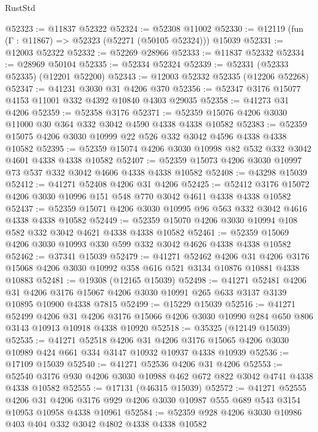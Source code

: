 \begin{lexlean}{RustStd}
\begin{coremodule}
@52323 := @11837 @52322
@52324 := @52308 @11002
@52330 := @12119 (fun (Γ : @11867) => @52323 (@52271 (@50105 @52324))) @15039
@52331 := @12003 @52322
@52332 := @52269 @28966
@52333 := @11837 @52332
@52334 := @28969 @50104
@52335 := @52334 @52324
@52339 := @52331 (@52333 @52335) (@12201 @52200)
@52343 := @12003 @52332 @52335 (@12206 @52268)
@52347 := @41231 @3030 @31 @4206 @370
@52356 := @52347 @3176 @15077 @4153 @11001 @332 @4392 @10840 @4303 @29035
@52358 := @41273 @31 @4206
@52359 := @52358 @3176
@52371 := @52359 @15076 @4206 @3030 @11000 @30 @364 @332 @3042 @4590 @4338 @4338 @10582
@52383 := @52359 @15075 @4206 @3030 @10999 @22 @526 @332 @3042 @4596 @4338 @4338 @10582
@52395 := @52359 @15074 @4206 @3030 @10998 @82 @532 @332 @3042 @4601 @4338 @4338 @10582
@52407 := @52359 @15073 @4206 @3030 @10997 @73 @537 @332 @3042 @4606 @4338 @4338 @10582
@52408 := @43298 @15039
@52412 := @41271 @52408 @4206 @31 @4206
@52425 := @52412 @3176 @15072 @4206 @3030 @10996 @151 @548 @770 @3042 @4611 @4338 @4338 @10582
@52437 := @52359 @15071 @4206 @3030 @10995 @96 @563 @332 @3042 @4616 @4338 @4338 @10582
@52449 := @52359 @15070 @4206 @3030 @10994 @108 @582 @332 @3042 @4621 @4338 @4338 @10582
@52461 := @52359 @15069 @4206 @3030 @10993 @330 @599 @332 @3042 @4626 @4338 @4338 @10582
@52462 := @37341 @15039
@52479 := @41271
    @52462
    @4206
    @31
    @4206
    @3176
    @15068
    @4206
    @3030
    @10992
    @358
    @616
    @521
    @3134
    @10876
    @10881
    @4338
    @10883
@52481 := @19308 (@12165 @15039)
@52498 := @41271
    @52481
    @4206
    @31
    @4206
    @3176
    @15067
    @4206
    @3030
    @10991
    @265
    @633
    @3137
    @3139
    @10895
    @10900
    @4338
    @7815
@52499 := @15229 @15039
@52516 := @41271
    @52499
    @4206
    @31
    @4206
    @3176
    @15066
    @4206
    @3030
    @10990
    @284
    @650
    @806
    @3143
    @10913
    @10918
    @4338
    @10920
@52518 := @35325 (@12149 @15039)
@52535 := @41271
    @52518
    @4206
    @31
    @4206
    @3176
    @15065
    @4206
    @3030
    @10989
    @424
    @661
    @334
    @3147
    @10932
    @10937
    @4338
    @10939
@52536 := @17109 @15039
@52540 := @41271 @52536 @4206 @31 @4206
@52553 := @52540 @3176 @930 @4206 @3030 @10988 @462 @672 @822 @3042 @4741 @4338 @4338 @10582
@52555 := @17131 (@46315 @15039)
@52572 := @41271
    @52555
    @4206
    @31
    @4206
    @3176
    @929
    @4206
    @3030
    @10987
    @555
    @689
    @543
    @3154
    @10953
    @10958
    @4338
    @10961
@52584 := @52359 @928 @4206 @3030 @10986 @403 @404 @332 @3042 @4802 @4338 @4338 @10582

\end{coremodule}
\end{lexlean}
